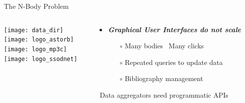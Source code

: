 \begin{frame}[t]{The N-Body Problem}

\begin{columns}[T]

      \begin{column}{.3\textwidth}
        \vspace{0.5em}\texttt{[image: data\_dir]}\\
        \vspace{0.5em}\texttt{[image: logo\_astorb]}\\
        \vspace{0.5em}\texttt{[image: logo\_mp3c]}\\
        \vspace{0.5em}\texttt{[image: logo\_ssodnet]}\\
      \end{column}

    \begin{column}{.7\textwidth}
      \begin{overlayarea}{\textwidth}{\textheight}

        \begin{itemize}[<.->]
          \item \emph{\bf Graphical User Interfaces do not scale}
            \begin{itemize}[<.->]
              \item[$\circ$] Many bodies \textrightarrow~Many clicks
              \item[$\circ$] Repeated queries to update data
              \item[$\circ$] Bibliography management
            \end{itemize}
        \end{itemize}
          \textrightarrow~Data aggregators need programmatic APIs


\end{overlayarea}
\end{column}
\end{columns}
\end{frame}
